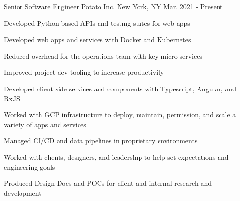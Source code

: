 


\begin{cventries}


\cventry
{Senior Software Engineer} %
{Potato Inc.} %
{New York, NY} %
{Mar. 2021 - Present} %
{ %
\begin{cvitems}
\item {Developed Python based APIs and testing suites for web apps}
\item {Developed web apps and services with Docker and Kubernetes}
\item {Reduced overhead for the operations team with key micro services}
\item {Improved project dev tooling to increase productivity}
\item {Developed client side services and components with Typescript, Angular, and RxJS}
\item {Worked with GCP infrastructure to deploy, maintain, permission, and scale a variety of apps and services}
\item {Managed CI/CD and data pipelines in proprietary environments}
\item {Worked with clients, designers, and leadership to help set expectations and engineering goals}
\item {Produced Design Docs and POCs for client and internal research and development}
\end{cvitems}
\bigskip
}



\end{cventries}
